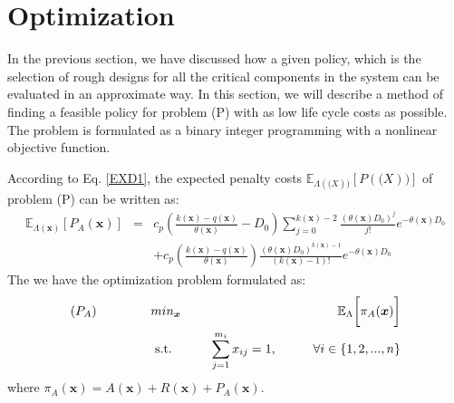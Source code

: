 \documentclass[preprint,12pt]{elsarticle}
\begin{document}

\section{Optimization}

In the previous section, we have discussed how a given policy, which is the selection of rough designs for all the critical components in the system can be evaluated in an approximate way. In this section, we will describe a method of finding a feasible policy for problem (P) with as low life cycle costs as possible. The problem is formulated as a binary integer programming with a nonlinear objective function.

According to Eq. \eqref{EXD1}, the expected penalty costs $\mathbb{E}_{\Lambda(\boldsymbol(X))}[P(\boldsymbol(X))]$ of problem (P) can be written as:
\begin{eqnarray}
\mathbb{E}_{\Lambda(\boldsymbol{x})}[P_{A}(\boldsymbol{x})]&=&c_{p}(\frac{k(\boldsymbol{x})-q(\boldsymbol{x})}{\theta(\boldsymbol{x})}-D_{0})\sum_{j=0}^{k(\boldsymbol{x})-2}{\frac{(\theta(\boldsymbol{x}) D_{0})^j}{j!}e^{-\theta(\boldsymbol{x}) D_{0}}}\nonumber\\
&&+c_{p}(\frac{k(\boldsymbol{x})-q(\boldsymbol{x})}{\theta(\boldsymbol{x})})\frac{(\theta(\boldsymbol{x})D_{0})^{k(\boldsymbol{x})-1}}{(k(\boldsymbol{x})-1)!}e^{-\theta(\boldsymbol{x})D_{0}}
\end{eqnarray}
The we have the optimization problem formulated as:
\begin{eqnarray}
\text{($P_{A}$)} \hspace{15mm} & min_{\boldsymbol{x}} & \hspace{10mm} \mathbb{E}_{\Lambda} \bigg[ \pi_{A}(\boldsymbol{x})\bigg] \nonumber\\
& \text{ s.t. }&  \hspace{5mm} \sum_{j=1}^{m_i}{x_{ij}}=1, \hspace{10mm} \forall i \in \{1,2,...,n\} \nonumber
\end{eqnarray}
where $\pi_{A}(\boldsymbol{x})=A(\boldsymbol{x})+R(\boldsymbol{x})+P_{A}(\boldsymbol{x})$.
\end{document}
